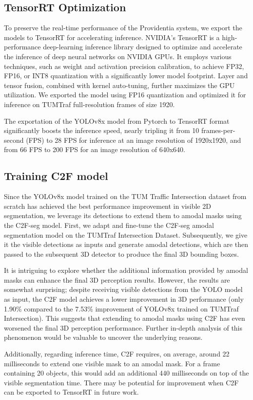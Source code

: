 \subsection{TensorRT Optimization}

To preserve the real-time performance of the Providentia system, we export the models to TensorRT for accelerating inference. NVIDIA’s TensorRT  \cite{vanholder2016efficient} is a high-performance deep-learning inference library designed to optimize and accelerate the inference of deep neural networks on NVIDIA GPUs. It employs various techniques, such as weight and activation precision calibration, to achieve FP32, FP16, or INT8 quantization with a significantly lower model footprint. Layer and tensor fusion, combined with kernel auto-tuning, further maximizes the GPU utilization. We exported the model using FP16 quantization and optimized it for inference on TUMTraf full-resolution frames of size 1920.

The exportation of the YOLOv8x model from Pytorch to TensorRT format significantly boosts the inference speed, nearly tripling it from 10 frames-per-second (FPS) to 28 FPS for inference at an image resolution of 1920x1920, and from 66 FPS to 200 FPS for an image resolution of 640x640.

\subsection{Training C2F model}

Since the YOLOv8x model trained on the TUM Traffic Intersection dataset from scratch has achieved the best performance improvement in visible 2D segmentation, we leverage its detections to extend them to amodal masks using the C2F-seg model. First, we adapt and fine-tune the C2F-seg amodal segmentation model on the TUMTraf Intersection Dataset. Subsequently, we give it the visible detections as inputs and generate amodal detections, which are then passed to the subsequent 3D detector to produce the final 3D bounding boxes.

It is intriguing to explore whether the additional information provided by amodal masks can enhance the final 3D perception results. However, the results are somewhat surprising; despite receiving visible detections from the YOLO model as input, the C2F model achieves a lower improvement in 3D performance (only 1.90\% compared to the 7.53\% improvement of YOLOv8x trained on TUMTraf Intersection). This suggests that extending to amodal masks using C2F has even worsened the final 3D perception performance. Further in-depth analysis of this phenomenon would be valuable to uncover the underlying reasons.

Additionally, regarding inference time, C2F requires, on average, around 22 milliseconds to extend one visible mask to an amodal mask. For a frame containing 20 objects, this would add an additional 440 milliseconds on top of the visible segmentation time. There may be potential for improvement when C2F can be exported to TensorRT in future work.
